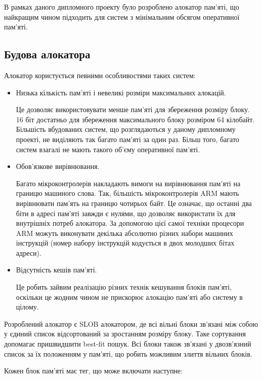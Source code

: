 \documentclass[oneside,14pt,a4paper,final]{myextreport}
\begin{document}
В рамках даного дипломного проекту було розроблено алокатор пам'яті, що найкращим чином підходить для систем з мінімальним обсягом оперативної пам'яті.

\subsection{Будова алокатора}

Алокатор користується певними особливостями таких систем:
\begin{itemize}
\item Низька кількість пам'яті і невеликі розміри максимальних алокацій.

  Це дозволяє використовувати менше пам'яті для збереження розміру блоку. 16 біт достатньо для збереження максимального блоку розміром 64 кілобайт. Більшість вбудованих систем, що розглядаються у даному дипломному проекті, не виділяють так багато пам'яті за один раз. Більш того, багато систем взагалі не мають такого об'єму оперативної пам'яті.

\item Обов'язкове вирівнювання.

  Багато мікроконтролерів накладають вимоги на вирівнювання пам'яті на границю машиного слова. Так, більшість мікроконтролерів ARM мають вирівнювати пам'ять на границю чотирьох байт. Це означає, що останні два біти в адресі пам'яті завжди є нулями, що дозволяє використати їх для внутрішніх потреб алокатора. За допомогою цієї самої техніки процесори ARM можуть виконувати декілька абсолютно різних набори машиних інструкцій (номер набору інструкцій кодується в двох молодших бітах адреси).

\item Відсутність кешів пам'яті.

  Це робить зайвим реалізацію різних технік кешування блоків пам'яті, оскільки це жодним чином не прискорює алокацію пам'яті або систему в цілому.
\end{itemize}

Розроблений алокатор є \acs{SLOB} алокатором, де всі вільні блоки зв'язані між собою у єдиний список відсортований за зростанням розміру блоку. Таке сортування допомагає пришвидшити best-fit пошук. Всі блоки також зв'язані у двозв'язний список за їх положенням у пам'яті, що робить можливим злиття вільних блоків.

Кожен блок пам'яті має тег, що може включати наступне:
\end{document}
